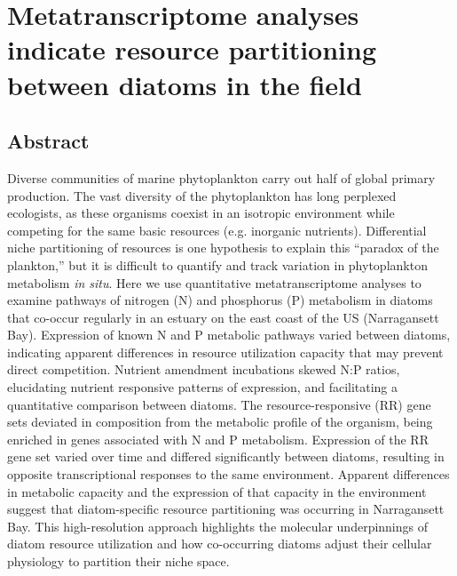 \chapter{Metatranscriptome analyses indicate resource partitioning between diatoms in the field}
\raggedbottom
\section{Abstract}
Diverse communities of marine phytoplankton carry out half of global primary production. The vast diversity of the phytoplankton has long perplexed ecologists, as these organisms coexist in an isotropic environment while competing for the same basic resources (e.g. inorganic nutrients). Differential niche partitioning of resources is one hypothesis to explain this ``paradox of the plankton,'' but it is difficult to quantify and track variation in phytoplankton metabolism \textit{in situ}. Here we use quantitative metatranscriptome analyses to examine pathways of nitrogen (N) and phosphorus (P) metabolism in diatoms that co-occur regularly in an estuary on the east coast of the US (Narragansett Bay). Expression of known N and P metabolic pathways varied between diatoms, indicating apparent differences in resource utilization capacity that may prevent direct competition.  Nutrient amendment incubations skewed N:P ratios, elucidating nutrient responsive patterns of expression, and facilitating a quantitative comparison between diatoms. The resource-responsive (RR) gene sets deviated in composition from the metabolic profile of the organism, being enriched in genes associated with N and P metabolism. Expression of the RR gene set varied over time and differed significantly between diatoms, resulting in opposite transcriptional responses to the same environment. Apparent differences in metabolic capacity and the expression of that capacity in the environment suggest that diatom-specific resource partitioning was occurring in Narragansett Bay. This high-resolution approach highlights the molecular underpinnings of diatom resource utilization and how co-occurring diatoms adjust their cellular physiology to partition their niche space. 
 
